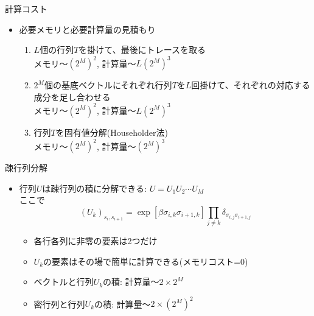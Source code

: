 \documentclass[dvipdfmx]{beamer}
\begin{document}
\begin{frame}[t,fragile]{計算コスト}
  \begin{itemize}
    \setlength{\itemsep}{1em}
  \item 必要メモリと必要計算量の見積もり
    \begin{enumerate}
    \item $L$個の行列$T$を掛けて、最後にトレースを取る \\
      メモリ〜$(2^M)^2$, 計算量〜$L(2^M)^3$
    \item $2^M$個の基底ベクトルにそれぞれ行列$T$を$L$回掛けて、それぞれの対応する成分を足し合わせる \\
      メモリ〜$(2^M)^2$, 計算量〜$L(2^M)^3$
    \item 行列$T$を固有値分解(Householder法) \\
      メモリ〜$(2^M)^2$, 計算量〜$(2^M)^3$
    \end{enumerate}
  \end{itemize}
\end{frame}

\begin{frame}[t,fragile]{疎行列分解}
  \begin{itemize}
    \setlength{\itemsep}{1em}
  \item 行列$U$は疎行列の積に分解できる: $U = U_1 U_2 \cdots U_M$ \\
    ここで
    \[
    (U_k)_{s_i, s_{i+1}} = \exp[\beta \sigma_{i,k} \sigma_{i+1,k}] \prod_{j \ne k} \delta_{\sigma_{i,j} \sigma_{i+1,j}}
    \]
    \begin{itemize}
    \item 各行各列に非零の要素は2つだけ
    \item $U_k$の要素はその場で簡単に計算できる(メモリコスト=0)
    \item ベクトルと行列$U_k$の積: 計算量〜$2 \times 2^M$
    \item 密行列と行列$U_k$の積: 計算量〜$2 \times (2^M)^2$
    \end{itemize}
  \end{itemize}
\end{frame}
\end{document}

